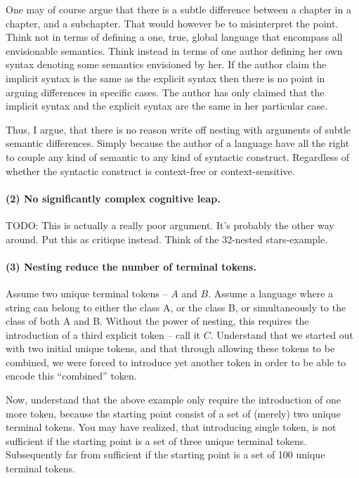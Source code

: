 \documentclass{scrreprt}
\begin{document}
One may of course argue that there is a subtle difference between a chapter in a chapter, and a subchapter. That would however be to misinterpret the point. Think not in terms of defining a one, true, global language that encompass all envisionable semantics. Think instead in terms of one author defining her own syntax denoting some semantics envisioned by her. If the author claim the implicit syntax is the same as the explicit syntax then there is no point in arguing differences in specific cases. The author has only claimed that the implicit syntax and the explicit syntax are the same in her particular case.

Thus, I argue, that there is no reason write off nesting with arguments of subtle semantic differences. Simply because the author of a language have all the right to couple any kind of semantic to any kind of syntactic construct. Regardless of whether the syntactic construct is context-free or context-sensitive.




\paragraph{(2) No significantly complex cognitive leap.}
TODO: This is actually a really poor argument. It's probably the other way around. Put this as critique instead. Think of the 32-nested stars-example.





\paragraph{(3) Nesting reduce the number of terminal tokens.}

Assume two unique terminal tokens -- \(A\) and \(B\). Assume a language where a string can belong to either the class A, or the class B, or simultaneously to the class of both A and B. Without the power of nesting, this requires the introduction of a third explicit token -- call it \(C\). Understand that we started out with two initial unique tokens, and that through allowing these tokens to be combined, we were forced to introduce yet another token in order to be able to encode this ``combined'' token.

Now, understand that the above example only require the introduction of one more token, because the starting point consist of a set of (merely) two unique terminal tokens. You may have realized, that introducing single token, is not sufficient if the starting point is a set of three unique terminal tokens. Subsequently far from sufficient if the starting point is a set of 100 unique terminal tokens.
\end{document}
